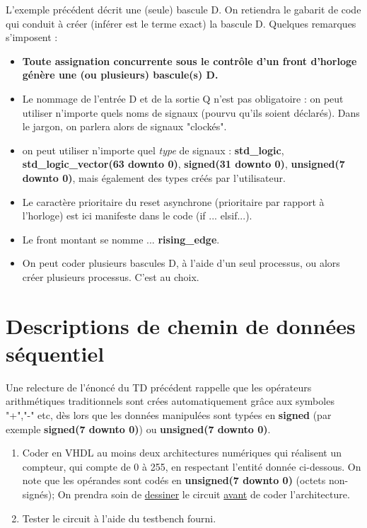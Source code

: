 \documentclass[a4paper,11pt]{article}
\begin{document}
L'exemple précédent décrit une (seule) bascule D. On retiendra le gabarit de code qui conduit à créer (inférer est le terme exact) la bascule D. Quelques remarques s'imposent :
\begin{itemize}
  \item \textbf{Toute assignation concurrente sous le contrôle d'un front d'horloge génère une (ou plusieurs) bascule(s) D.}
  \item Le nommage de l'entrée D et de la sortie Q n'est pas obligatoire : on peut utiliser n'importe quels noms de signaux (pourvu qu'ils soient déclarés).
  Dans le jargon, on parlera alors de signaux "clockés".
  \item on peut utiliser n'importe quel {\it type} de signaux : \textbf{std\_logic}, \textbf{std\_logic\_vector(63 downto 0)}, \textbf{signed(31 downto 0)}, \textbf{unsigned(7 downto 0)}, mais également des types créés par l'utilisateur.
  \item Le caractère prioritaire du reset asynchrone (prioritaire par rapport à l'horloge) est ici manifeste dans le code (if ... elsif...).
  \item Le front montant se nomme ... \textbf{rising\_edge}.
  \item On peut coder plusieurs bascules D, à l'aide d'un seul processus, ou alors créer plusieurs processus. C'est au choix.
\end{itemize}

\section{Descriptions de chemin de données séquentiel}

Une relecture de l'énoncé du TD précédent rappelle que les opérateurs arithmétiques traditionnels sont crées automatiquement grâce aux symboles "+","-" etc,
dès lors que les données manipulées sont typées en \textbf{signed}
(par exemple \textbf{signed(7 downto 0)}) ou \textbf{unsigned(7 downto 0)}.

\begin{enumerate}
  \item Coder en VHDL au moins deux architectures numériques qui
  réalisent un compteur, qui compte de 0 à 255, en respectant l'entité donnée ci-dessous.
  On note que les opérandes sont codés en \textbf{unsigned(7 downto 0)} (octets non-signés);
  On prendra soin de \underline{dessiner} le circuit \underline{avant} de coder l'architecture.
  \item Tester le circuit à l'aide du testbench fourni.
\end{enumerate}
\end{document}
